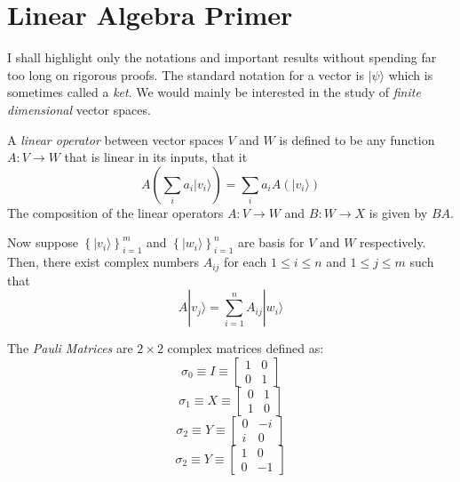 \newcommand{\ket}[1]{|#1\rangle}
\newcommand{\bra}[1]{\langle#1|}
\section{Linear Algebra Primer}
I shall highlight only the notations and important results without spending far too long on rigorous proofs. The standard notation for a vector is $\ket{\psi}$ which is sometimes called a \textit{ket}. We would mainly be interested in the study of \textit{finite dimensional} vector spaces. 

A \textit{linear operator} between vector spaces $V$ and $W$ is defined to be any function $A:V\to W$ that is linear in its inputs, that it
\begin{equation*}
    A\left(\sum_i a_i\ket{v_i}\right) = \sum_i a_iA\left(\ket{v_i}\right)
\end{equation*}
The composition of the linear operators $A:V\to W$ and $B:W\to X$ is given by $BA$.

Now suppose $\left\{\ket{v_i}\right\}_{i=1}^m$ and $\left\{\ket{w_i}\right\}_{i=1}^n$ are basis for $V$ and $W$ respectively. Then, there exist complex numbers $A_{ij}$ for each $1\le i\le n$ and $1\le j\le m$ such that 
\begin{equation*}
    A\ket{v_j} = \sum_{i=1}^nA_{ij}\ket{w_i}
\end{equation*}

The \textit{Pauli Matrices} are $2\times 2$ complex matrices defined as:
\begin{equation*}
    \sigma_0\equiv I\equiv 
    \begin{bmatrix}
        1 & 0\\ 0 & 1
    \end{bmatrix}
\end{equation*}
\begin{equation*}
    \sigma_1\equiv X\equiv 
    \begin{bmatrix}
        0 & 1\\ 1 & 0
    \end{bmatrix}
\end{equation*}
\begin{equation*}
    \sigma_2\equiv Y\equiv 
    \begin{bmatrix}
        0 & -i\\ i & 0
    \end{bmatrix}
\end{equation*}
\begin{equation*}
    \sigma_2\equiv Y\equiv 
    \begin{bmatrix}
        1 & 0\\ 0 & -1
    \end{bmatrix}
\end{equation*}

